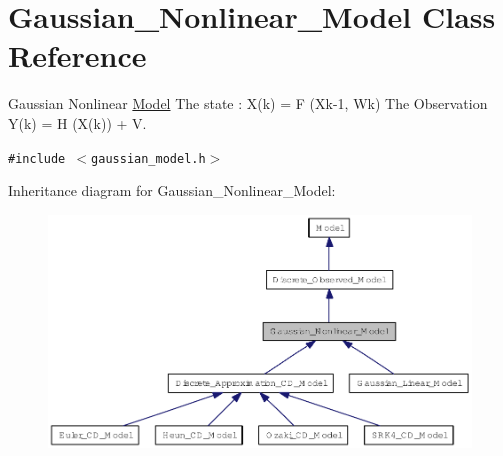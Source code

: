 \hypertarget{class_gaussian___nonlinear___model}{
\section{Gaussian\_\-Nonlinear\_\-Model Class Reference}
\label{class_gaussian___nonlinear___model}
}
Gaussian Nonlinear \hyperlink{class_model}{Model} The state : X(k) = F (Xk-1, Wk) The Observation Y(k) = H (X(k)) + V.  


{\tt \#include $<$gaussian\_\-model.h$>$}

Inheritance diagram for Gaussian\_\-Nonlinear\_\-Model:\nopagebreak
\begin{figure}[H]
\begin{center}
\leavevmode
\includegraphics[width=400pt]{class_gaussian___nonlinear___model__inherit__graph}
\end{center}
\end{figure}
